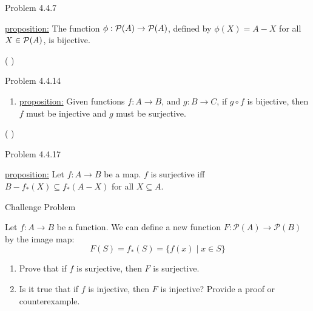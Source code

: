 \documentclass{article}
\theoremstyle{definition}
\begin{document}
	\noindent Problem 4.4.7  \vspace{0.3cm}

	\underline{proposition:}  The function $\phi :{\cal P}(A)\rightarrow
	{\cal P}(A)$, defined by $\phi (X)=A-X$ for all $X\in {\cal P}(A)$,
	is bijective.

	\vspace{.2cm}

	 ( ) \vspace{.15cm}



	\vspace{1cm}



	\noindent Problem 4.4.14  \vspace{0.3cm}

	\begin{enumerate}
		\item[3] \underline{proposition:} Given functions $f:A\rightarrow B$, and $g:B\rightarrow C$, if $g\circ f$ is bijective, then
		$f$ must be injective and $g$ must be surjective.

	\end{enumerate}
	\vspace{0.2cm}

	 ( )



	\vspace{1cm}




	\noindent Problem 4.4.17  \vspace{0.3cm}

	\underline{proposition:} Let $f:A\rightarrow B$ be a map.  $f$ is
	surjective iff $B-f_*(X)\subseteq f_*(A-X)$ for all $X\subseteq A$.

	\vspace{0.2cm}


	\vspace{0.2cm}




	\vspace{1cm}


	\noindent Challenge Problem  \vspace{0.3cm}

	Let $f: A \rightarrow B$ be a function. We can define a new function $F: \mathcal{P}(A) \rightarrow \mathcal{P}(B)$ by the image map:
	\[ F(S) = f_{*}(S) = \{ f(x)  \mid x \in S \} \]

	\begin{enumerate}
		\item Prove that if $f$ is surjective, then $F$ is surjective.
		\item Is it true that if $f$ is injective, then $F$ is injective? Provide a proof or counterexample.
	\end{enumerate}
\end{document}
